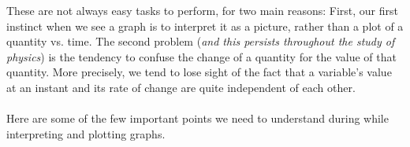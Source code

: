 \documentclass[12pt,addpoints]{exam}
\begin{document}
    These are not always easy tasks to perform, for two main reasons: First, our first instinct when we see a graph is to interpret it as a picture, rather than a plot of a quantity vs. time. The second problem (\textit{and this persists throughout the study of physics}) is the tendency to confuse the change of a quantity for the value of that quantity. More precisely, we tend to lose sight of the fact that a variable's value at an instant and its rate of change are quite independent of each other. \\ \\
    Here are some of the few important points we need to understand during while interpreting and plotting graphs.
    
    
    
\end{document}
